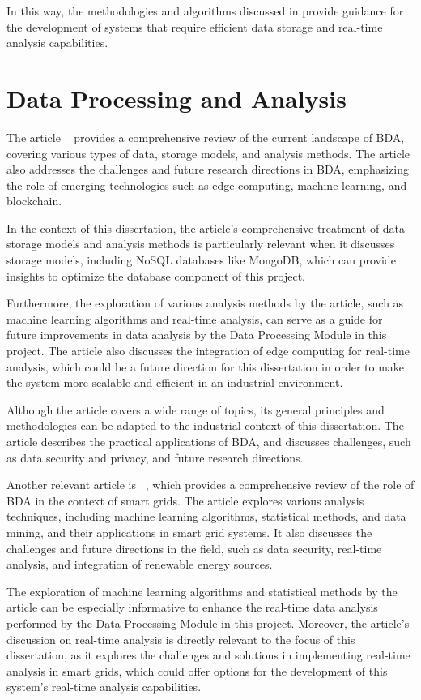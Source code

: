 In this way, the methodologies and algorithms discussed in \cite{sarker2021machine} provide guidance for the development of systems that require efficient data storage and real-time analysis capabilities.

\section{Data Processing and Analysis}
The article ~\cite{Lv2017} provides a comprehensive review of the current landscape of \gls{BDA}, covering various types of data, storage models, and analysis methods. The article also addresses the challenges and future research directions in \gls{BDA}, emphasizing the role of emerging technologies such as edge computing, machine learning, and blockchain.

In the context of this dissertation, the article's comprehensive treatment of data storage models and analysis methods is particularly relevant when it discusses storage models, including NoSQL databases like MongoDB, which can provide insights to optimize the database component of this project.

Furthermore, the exploration of various analysis methods by the article, such as machine learning algorithms and real-time analysis, can serve as a guide for future improvements in data analysis by the Data Processing Module in this project. The article also discusses the integration of edge computing for real-time analysis, which could be a future direction for this dissertation in order to make the system more scalable and efficient in an industrial environment.

Although the article covers a wide range of topics, its general principles and methodologies can be adapted to the industrial context of this dissertation. The article describes the practical applications of \gls{BDA}, and discusses challenges, such as data security and privacy, and future research directions.

Another relevant article is ~\cite{Zhang2018}, which provides a comprehensive review of the role of \gls{BDA} in the context of smart grids. The article explores various analysis techniques, including machine learning algorithms, statistical methods, and data mining, and their applications in smart grid systems. It also discusses the challenges and future directions in the field, such as data security, real-time analysis, and integration of renewable energy sources.

The exploration of machine learning algorithms and statistical methods by the article can be especially informative to enhance the real-time data analysis performed by the Data Processing Module in this project. Moreover, the article's discussion on real-time analysis is directly relevant to the focus of this dissertation, as it explores the challenges and solutions in implementing real-time analysis in smart grids, which could offer options for the development of this system's real-time analysis capabilities.


